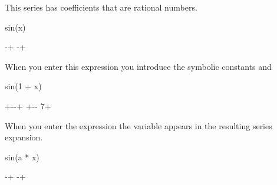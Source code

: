 {{{{{{{{{{{{{{\begin{xtc}
\begin{xtccomment}
This series has coefficients that are rational numbers.
\end{xtccomment}
\begin{spadsrc}
sin(x) 
\end{spadsrc}
\begin{TeXOutput}
\begin{fricasmath}{3}
-{\TIMES {}}+\TIMES %
-{\TIMES {}}+%
%
\end{fricasmath}
\end{TeXOutput}
\end{xtc}
\begin{xtc}
\begin{xtccomment}
When you enter this expression
you introduce the symbolic constants  and 
\end{xtccomment}
\begin{spadsrc}
sin(1 + x) 
\end{spadsrc}
\begin{TeXOutput}
\begin{fricasmath}{4}
+\TIMES {}-{\TIMES {}}-{\TIMES {}}+\TIMES %
+\TIMES {}-{\TIMES {}}-{\TIMES \SUPER%
{}{7}}+%
\end{fricasmath}
\end{TeXOutput}
\end{xtc}
\begin{xtc}
\begin{xtccomment}
When you enter the expression
the variable  appears in the resulting series expansion.
\end{xtccomment}
\begin{spadsrc}
sin(a * x) 
\end{spadsrc}
\begin{TeXOutput}
\begin{fricasmath}{5}
\TIMES {}-{\TIMES {}}+\TIMES {}%
-{\TIMES {}}+%
%
\end{fricasmath}
\end{TeXOutput}
\end{xtc}

}}}}}}}}}}}}}}

